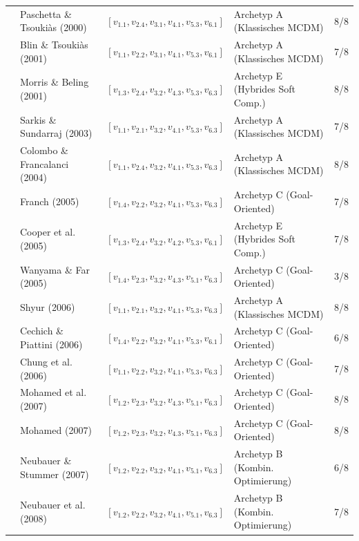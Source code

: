 \begin{longtable}{p{} p{} p{} p{} p{}}
\cite{LZQJ6M4X} & Paschetta \& Tsoukiàs (2000) & $[v_{1.1}, v_{2.4}, v_{3.1}, v_{4.1}, v_{5.3}, v_{6.1}]$ & Archetyp A (Klassisches MCDM) & 8/8 \\
\cite{M3B2D3GD} & Blin \& Tsoukiàs (2001) & $[v_{1.1}, v_{2.2}, v_{3.1}, v_{4.1}, v_{5.3}, v_{6.1}]$ & Archetyp A (Klassisches MCDM) & 7/8 \\
\cite{QDUNCXFC} & Morris \& Beling (2001) & $[v_{1.3}, v_{2.4}, v_{3.2}, v_{4.3}, v_{5.3}, v_{6.3}]$ & Archetyp E (Hybrides Soft Comp.) & 8/8 \\
\cite{FCYW9EWJ} & Sarkis \& Sundarraj (2003) & $[v_{1.1}, v_{2.1}, v_{3.2}, v_{4.1}, v_{5.3}, v_{6.3}]$ & Archetyp A (Klassisches MCDM) & 7/8 \\
\cite{DAU8NSK8} & Colombo \& Francalanci (2004) & $[v_{1.1}, v_{2.4}, v_{3.2}, v_{4.1}, v_{5.3}, v_{6.3}]$ & Archetyp A (Klassisches MCDM) & 8/8 \\
\cite{TLB687YL} & Franch (2005) & $[v_{1.4}, v_{2.2}, v_{3.2}, v_{4.1}, v_{5.3}, v_{6.3}]$ & Archetyp C (Goal-Oriented) & 7/8 \\
\cite{CI86GRRG} & Cooper et al. (2005) & $[v_{1.3}, v_{2.4}, v_{3.2}, v_{4.2}, v_{5.3}, v_{6.1}]$ & Archetyp E (Hybrides Soft Comp.) & 7/8 \\
\cite{CZZ6XQZJ} & Wanyama \& Far (2005) & $[v_{1.4}, v_{2.3}, v_{3.2}, v_{4.3}, v_{5.1}, v_{6.3}]$ & Archetyp C (Goal-Oriented) & 3/8 \\
\cite{U5JPV4SF} & Shyur (2006) & $[v_{1.1}, v_{2.1}, v_{3.2}, v_{4.1}, v_{5.3}, v_{6.3}]$ & Archetyp A (Klassisches MCDM) & 8/8 \\
\cite{8XNYS4M9} & Cechich \& Piattini (2006) & $[v_{1.4}, v_{2.2}, v_{3.2}, v_{4.1}, v_{5.3}, v_{6.1}]$ & Archetyp C (Goal-Oriented) & 6/8 \\
\cite{6RNULWVY} & Chung et al. (2006) & $[v_{1.1}, v_{2.2}, v_{3.2}, v_{4.1}, v_{5.3}, v_{6.3}]$ & Archetyp C (Goal-Oriented) & 7/8 \\
\cite{MC9UMXZZ} & Mohamed et al. (2007) & $[v_{1.2}, v_{2.3}, v_{3.2}, v_{4.3}, v_{5.1}, v_{6.3}]$ & Archetyp C (Goal-Oriented) & 8/8 \\
\cite{9F79VAAB} & Mohamed (2007) & $[v_{1.2}, v_{2.3}, v_{3.2}, v_{4.3}, v_{5.1}, v_{6.3}]$ & Archetyp C (Goal-Oriented) & 8/8 \\
\cite{ZQMG69VT} & Neubauer \& Stummer (2007) & $[v_{1.2}, v_{2.2}, v_{3.2}, v_{4.1}, v_{5.1}, v_{6.3}]$ & Archetyp B (Kombin. Optimierung) & 6/8 \\
\cite{MZ8JHDYA} & Neubauer et al. (2008) & $[v_{1.2}, v_{2.2}, v_{3.2}, v_{4.1}, v_{5.1}, v_{6.3}]$ & Archetyp B (Kombin. Optimierung) & 7/8 \\

\end{longtable}
